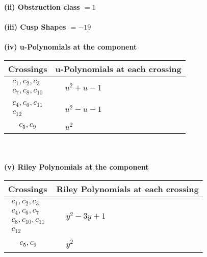 \documentclass[1p]{elsarticle_modified}
\theoremstyle{definition}
\begin{document}
\flushleft \textbf{(ii) Obstruction class $= 1$}\\~\\
\flushleft \textbf{(iii) Cusp Shapes $= -19$}\\~\\
\newpage\renewcommand{\arraystretch}{1}
\flushleft \textbf{(iv) u-Polynomials at the component}\newline \\
\begin{tabular}{m{50pt}|m{274pt}}
Crossings & \hspace{64pt}u-Polynomials at each crossing \\
\hline $$\begin{aligned}c_{1},c_{2},c_{3}\\c_{7},c_{8},c_{10}\end{aligned}$$&$\begin{aligned}
&u^2+u-1
\end{aligned}$\\
\hline $$\begin{aligned}c_{4},c_{6},c_{11}\\c_{12}\end{aligned}$$&$\begin{aligned}
&u^2- u-1
\end{aligned}$\\
\hline $$\begin{aligned}c_{5},c_{9}\end{aligned}$$&$\begin{aligned}
&u^2
\end{aligned}$\\
\hline
\end{tabular}\\~\\
\newpage\renewcommand{\arraystretch}{1}
\flushleft \textbf{(v) Riley Polynomials at the component}\newline \\
\begin{tabular}{m{50pt}|m{274pt}}
Crossings & \hspace{64pt}Riley Polynomials at each crossing \\
\hline $$\begin{aligned}c_{1},c_{2},c_{3}\\c_{4},c_{6},c_{7}\\c_{8},c_{10},c_{11}\\c_{12}\end{aligned}$$&$\begin{aligned}
&y^2-3 y+1
\end{aligned}$\\
\hline $$\begin{aligned}c_{5},c_{9}\end{aligned}$$&$\begin{aligned}
&y^2
\end{aligned}$\\
\hline
\end{tabular}\\~\\
\end{document}
